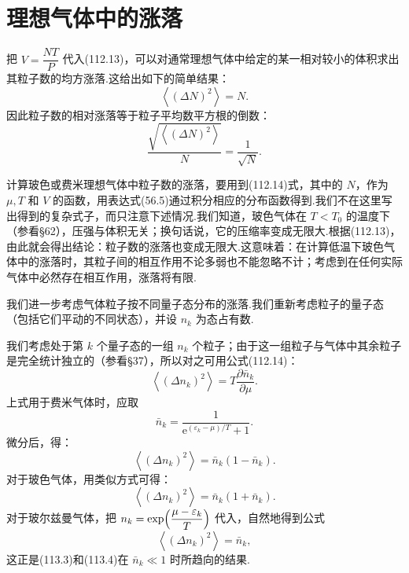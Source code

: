 \section{理想气体中的涨落}

把 $V=\dfrac{NT}{P}$ 代入(112.13)，可以对通常理想气体中给定的某一相对较小的体积求出其粒子数的均方涨落.这给出如下的简单结果：
\begin{equation}
  \left\langle(\Delta N)^{2}\right\rangle=N.
\end{equation}
因此粒子数的相对涨落等于粒子平均数平方根的倒数：
\begin{equation*}
  \frac{\sqrt{\left\langle(\Delta N)^{2}\right\rangle}}{N}
  =\frac{1}{\sqrt{N}}.
\end{equation*}

计算玻色或费米理想气体中粒子数的涨落，要用到(112.14)式，其中的 $N$，作为 $\mu,T$ 和
$V$ 的函数，用表达式(56.5)通过积分相应的分布函数得到.我们不在这里写出得到的复杂式子，而只注意下述情况.我们知道，玻色气体在 $T<T_{0}$ 的温度下（参看§62），压强与体积无关；换句话说，它的压缩率变成无限大.根据(112.13)，由此就会得出结论：粒子数的涨落也变成无限大.这意味着：在计算低温下玻色气体中的涨落时，其粒子间的相互作用不论多弱也不能忽略不计；考虑到在任何实际气体中必然存在相互作用，涨落将有限.

我们进一步考虑气体粒子按不同量子态分布的涨落.我们重新考虑粒子的量子态（包括它们平动的不同状态），并设 $n_{k}$ 为态占有数.

我们考虑处于第 $k$ 个量子态的一组 $n_{k}$ 个粒子；由于这一组粒子与气体中其余粒子是完全统计独立的（参看§37），所以对之可用公式(112.14)：
\begin{equation}
  \left\langle(\Delta n_{k})^{2}\right\rangle=T\frac{\partial\bar{n}_{k}}{\partial\mu}.
\end{equation}
上式用于费米气体时，应取
\begin{equation*}
  \bar{n}_{k}=\frac{1}{\mathrm{e}^{(\varepsilon_{k}-\mu)/T}+1}.
\end{equation*}
微分后，得：
\begin{equation}
  \left\langle(\Delta n_{k})^{2}\right\rangle=\bar{n}_{k}(1-\bar{n}_{k}).
\end{equation}
对于玻色气体，用类似方式可得：
\begin{equation}
  \left\langle(\Delta n_{k})^{2}\right\rangle=\bar{n}_{k}(1+\bar{n}_{k}).
\end{equation}
对于玻尔兹曼气体，把 $n_{k}=\exp\Bigl(\dfrac{\mu-\varepsilon_{k}}{T}\Bigr)$ 代入，自然地得到公式
\begin{equation}
  \left\langle(\Delta n_{k})^{2}\right\rangle=\bar{n}_{k},
\end{equation}
这正是(113.3)和(113.4)在 $\bar{n}_{k}\ll1$ 时所趋向的结果.

